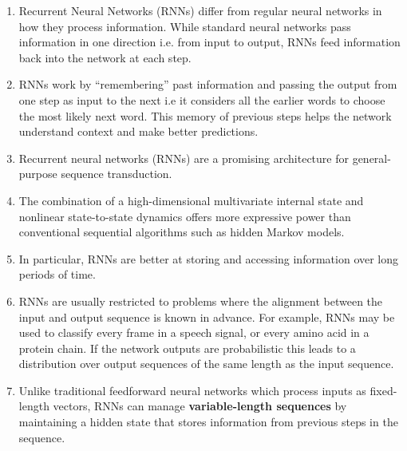 \begin{enumerate}
    \item Recurrent Neural Networks (RNNs) differ from regular neural networks in how they process information. While standard neural networks pass information in one direction i.e. from input to output, RNNs feed information back into the network at each step.
    \hfill \cite{geeksforgeeks/machine-learning/introduction-to-recurrent-neural-network}

    \item RNNs work by “remembering” past information and passing the output from one step as input to the next i.e it considers all the earlier words to choose the most likely next word. 
    This memory of previous steps helps the network understand context and make better predictions.
    \hfill \cite{geeksforgeeks/machine-learning/introduction-to-recurrent-neural-network}

    \item Recurrent neural networks (RNNs) are a promising architecture for general-purpose sequence transduction.
    \hfill \cite{arxiv/1211.3711/Sequence-Transduction-RNN}

    \item The combination of a high-dimensional multivariate internal state and nonlinear state-to-state dynamics offers more expressive power than conventional sequential algorithms such as hidden Markov models.
    \hfill \cite{arxiv/1211.3711/Sequence-Transduction-RNN}

    \item In particular, RNNs are better at storing and accessing information over long periods of time.
    \hfill \cite{arxiv/1211.3711/Sequence-Transduction-RNN}

    \item RNNs are usually restricted to problems where the alignment between the input and output sequence is known in advance.
    For example, RNNs may be used to classify every frame in a speech signal, or every amino acid in a protein chain. 
    If the network outputs are probabilistic this leads to a distribution over output sequences of the same length as the input sequence. 
    \hfill \cite{arxiv/1211.3711/Sequence-Transduction-RNN}

    \item Unlike traditional feedforward neural networks which process inputs as fixed-length vectors, RNNs can manage \textbf{variable-length sequences} by maintaining a hidden state that stores information from previous steps in the sequence.
    \hfill \cite{geeksforgeeks/deep-learning/bidirectional-recurrent-neural-network}
\end{enumerate}





